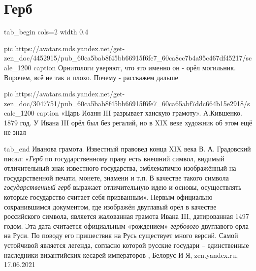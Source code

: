  
 
 
 
 
\chapter{Герб}

\ifcmt
tab_begin cols=2
  width 0.4

  pic https://avatars.mds.yandex.net/get-zen_doc/4452915/pub_60ca5bab8f45bb66915f6fe7_60ca8cc7b4a95c467df45217/scale_1200
  caption Орнитологи уверяют, что это именно он - орёл могильник. Впрочем, всё не так и плохо. Почему - расскажем дальше

  pic https://avatars.mds.yandex.net/get-zen_doc/3047751/pub_60ca5bab8f45bb66915f6fe7_60ca65abf7ddc664b15e2918/scale_1200
  caption «Царь Иоанн III разрывает ханскую грамоту». А.Кившенко. 1879 год. У Ивана III орёл был без регалий, но в XIX веке художник об этом ещё не знал

tab_end
\fi
Иванова грамота. Известный правовед конца XIX века В. А. Градовский писал:
«\emph{Герб} по государственному праву есть внешний символ, видимый отличительный знак
известного государства, эмблематично изображённый на государственной печати,
монете, знамени и т.п. В качестве такого символа \emph{государственный герб} выражает
отличительную идею и основы, осуществлять которые государство считает себя
призванным».  Первым официально сохранившимся документом, где изображён
двуглавый орёл в качестве российского символа, является жалованная грамота
Ивана III, датированная 1497 годом. Эта дата считается официальным «рождением»
\emph{гербового} двуглавого орла на Руси. По поводу его пришествия на Русь существует
много версий. Самой устойчивой является легенда, согласно которой русские
государи – единственные наследники византийских кесарей-императоров
, 
Белорус И Я, zen.yandex.ru, 17.06.2021
